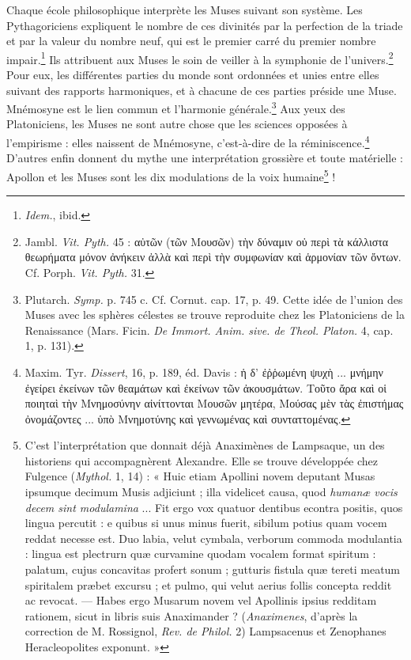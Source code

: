 \documentclass[a4paper, 11pt, oneside, polutonikogreek, french]{article}
\begin{document}
Chaque école philosophique interprète les Muses suivant son système. Les Pythagoriciens expliquent le nombre de ces divinités par la perfection de la triade et par la valeur du nombre neuf, qui est le premier carré du premier nombre impair.\footnote{\emph{Idem.}, ibid.} Ils attribuent aux Muses le soin de veiller à la symphonie de l'univers.\footnote{Jambl. \emph{Vit. Pyth.} 45 : αὐτῶν (τῶν Μουσῶν) τὴν δύναμιν οὐ περὶ τὰ κάλλιστα θεωρήματα μόνον ἀνήκειν ἀλλὰ καὶ περὶ τὴν συμφωνίαν καὶ ἁρμονίαν τῶν ὄντων. Cf. Porph. \emph{Vit. Pyth.} 31.} Pour eux, les différentes parties du monde sont ordonnées et unies entre elles suivant des rapports harmoniques, et à chacune de ces parties préside une Muse. Mnémosyne est le lien commun et l'harmonie générale.\footnote{Plutarch. \emph{Symp.} p. 745 c. Cf. Cornut. cap. 17, p. 49. Cette idée de l'union des Muses avec les sphères célestes se trouve reproduite chez les Platoniciens de la Renaissance (Mars. Ficin. \emph{De Immort. Anim. sive. de Theol. Platon.} 4, cap. 1, p. 131).} Aux yeux des Platoniciens, les Muses ne sont autre chose que les sciences opposées à l'empirisme : elles naissent de Mnémosyne, c'est-à-dire de la réminiscence.\footnote{Maxim. Tyr. \emph{Dissert}, 16, p. 189, éd. Davis : ἡ δ' ἐῤῥωμένη ψυχὴ ... μνήμην ἐγείρει ἐκείνων τῶν θεαμάτων καὶ ἐκείνων τῶν ἀκουσμάτων. Τοῦτο ἄρα καὶ οἱ ποιηταὶ τὴν Μνημοσύνην αἰνίττονται Μουσῶν μητέρα, Μούσας μὲν τὰς ἐπιστήμας ὀνομάζοντες ... ὑπὸ Μνημοτύνης καὶ γεννωμένας καὶ συνταττομένας.} D'autres enfin donnent du mythe une interprétation grossière et toute matérielle : Apollon et les Muses sont les dix modulations de la voix humaine\footnote{C'est l'interprétation que donnait déjà Anaximènes de Lampsaque, un des historiens qui accompagnèrent Alexandre. Elle se trouve développée chez Fulgence (\emph{Mythol.} 1, 14) : « Huic etiam Apollini novem deputant Musas ipsumque decimum Musis adjiciunt ; illa videlicet causa, quod \emph{humanæ vocis decem sint modulamina} ... Fit ergo vox quatuor dentibus econtra positis, quos lingua percutit : e quibus si unus minus fuerit, sibilum potius quam vocem reddat necesse est. Duo labia, velut cymbala, verborum commoda modulantia : lingua est plectrurn quæ curvamine quodam vocalem format spiritum : palatum, cujus concavitas profert sonum ; gutturis fistula quæ tereti meatum spiritalem præbet excursu ; et pulmo, qui velut aerius follis concepta reddit ac revocat. --- Habes ergo Musarum novem vel Apollinis ipsius redditam rationem, sicut in libris suis Anaximander ? (\emph{Anaximenes}, d'après la correction de M. Rossignol, \emph{Rev. de Philol.} 2) Lampsacenus et Zenophanes Heracleopolites exponunt. »} !
\end{document}
